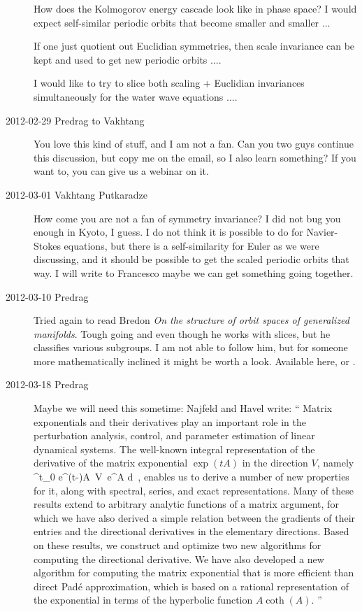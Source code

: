 \begin{description}
How does the Kolmogorov energy cascade look like in phase space?  I
would expect self-similar periodic orbits that become smaller and
smaller ...

If one just quotient out Euclidian symmetries, then scale invariance
can be kept and used to get new periodic orbits ....

I would like to try to slice both scaling + Euclidian invariances
simultaneously for the water wave equations ....

\item[2012-02-29 Predrag to Vakhtang] You love this kind of stuff, and I
am not a fan. Can you two guys continue this discussion, but copy me on
the email, so I also learn something? If you want to, you can give us a
webinar on it.

\item[2012-03-01 Vakhtang Putkaradze] How come you are not a fan of
symmetry invariance? I did not bug you enough in Kyoto, I guess. I do not
think it is possible to do for Navier-Stokes equations, but there is a
self-similarity for Euler as we were discussing, and it should be
possible to get the scaled periodic orbits that way. I will write to
Francesco maybe we can get something going together.

\item[2012-03-10 Predrag] Tried again to read Bredon
\emph{On the structure of orbit spaces of generalized manifolds}. Tough
going and even though he works with slices, but he classifies various
subgroups. I am not able to follow him, but for someone more
mathematically inclined it might be worth a look. Available
{here}, or
.

\item[2012-03-18 Predrag] Maybe we will need this sometime:
Najfeld and  Havel  write: `` Matrix exponentials and their
derivatives play an important role in the perturbation analysis, control,
and parameter estimation of linear dynamical systems. The well-known
integral representation of the derivative of the matrix exponential
$\exp(tA)$ in the direction $V$, namely
\beq
\int^t_0 e^{(t-\tau)A}\, V \,e^{\tau A} d\tau
\,,
enables us to derive a number of new properties for it, along with
spectral, series, and exact representations. Many of these results extend
to arbitrary analytic functions of a matrix argument, for which we have
also derived a simple relation between the gradients of their entries and
the directional derivatives in the elementary directions. Based on these
results, we construct and optimize two new algorithms for computing the
directional derivative. We have also developed a new algorithm for
computing the matrix exponential that is more efficient than direct
Pad\'e approximation, which is based on a rational representation of the
exponential in terms of the hyperbolic function $A \coth(A)$.
''


\end{description}
